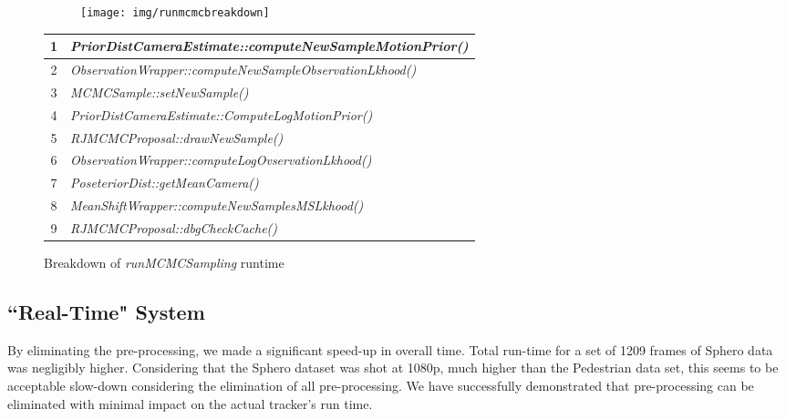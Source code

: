 	\begin{figure}[!htm]
		\centering
		\begin{subfigure}[b]{0.4\textwidth}
			\texttt{[image: img/runmcmcbreakdown]}
		\end{subfigure}

		\begin{tabularx}{0.45\textwidth}{ | c | X |}
			\hline
			1	&	\emph{\tiny PriorDistCameraEstimate::computeNewSampleMotionPrior()} \\ \hline
			2	&	\emph{\tiny ObservationWrapper::computeNewSampleObservationLkhood()} \\ \hline
			3	&	\emph{\tiny MCMCSample::setNewSample()} \\ \hline
			4	&	\emph{\tiny PriorDistCameraEstimate::ComputeLogMotionPrior()} \\ \hline
			5	&	\emph{\tiny RJMCMCProposal::drawNewSample()} \\ \hline
			6	&	\emph{\tiny ObservationWrapper::computeLogOvservationLkhood()} \\ \hline
			7	&	\emph{\tiny PoseteriorDist::getMeanCamera()} \\ \hline
			8	&	\emph{\tiny MeanShiftWrapper::computeNewSamplesMSLkhood()} \\ \hline
			9	&	\emph{\tiny RJMCMCProposal::dbgCheckCache()} \\ \hline
		\end{tabularx}
		\caption{Breakdown of \emph{runMCMCSampling} runtime}
		\label{fig:runmcmclookup}
	\end{figure}
	
\subsection{``Real-Time" System}
	By eliminating the pre-processing, we made a significant speed-up in overall time. Total run-time for a set of 1209 frames of
	Sphero data was negligibly higher. Considering that the Sphero dataset was shot at 1080p, much higher than the
	Pedestrian data set, this seems to be acceptable slow-down considering the elimination of all pre-processing. We have
	successfully demonstrated that pre-processing can be eliminated with minimal impact on the actual tracker's run time.